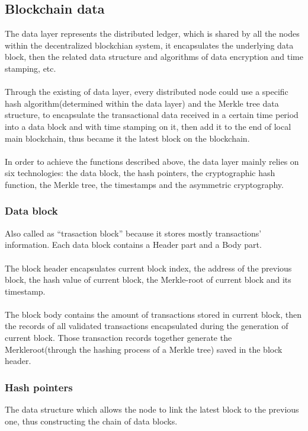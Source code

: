 \documentclass[]{article}
\begin{document}
\begin{CJK*}{UTF8}{gbsn}
\subsection{Blockchain data}
The data layer represents the distributed ledger, which is shared by all the nodes within the decentralized blockchian system, it encapsulates the underlying data block, then the related data structure and algorithms of data encryption and time stamping, etc.
\paragraph{} 
Through the existing of data layer, every distributed node could use a specific hash algorithm(determined within the data layer) and the Merkle tree data structure, to encapsulate the transactional data received in a certain time period into a data block and with time stamping on it, then add it to the end of local main blockchain, thus became it the latest block on the blockchain.
\paragraph{} 
In order to achieve the functions described above, the data layer mainly relies on six technologies: the data block, the hash pointers, the cryptographic hash function, the Merkle tree, the timestamps and the asymmetric cryptography.
\subsubsection*{Data block}
Also called as ``trasaction block'' because it stores mostly transactions' information. Each data block contains a Header part and a Body part.
\paragraph{} 
The block header encapsulates current block index, the address of the previous block, the hash value of current block, the Merkle-root of current block and its timestamp.
\paragraph{} 
The block body contains the amount of transactions stored in current block, then the records of all validated transactions encapsulated during the generation of current block. Those transaction records together generate the Merkleroot(through the hashing process of a Merkle tree) saved in the block header. 
\subsubsection*{Hash pointers}
The data structure which allows the node to link the latest block to the previous one, thus constructing the chain of data blocks.

\end{CJK*}
\end{document}
